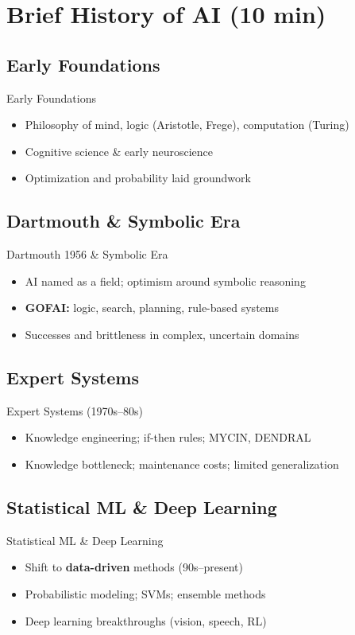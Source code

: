\documentclass[aspectratio=169]{beamer}
\begin{document}
\section{Brief History of AI (10 min)}

\subsection{Early Foundations}
\begin{frame}{Early Foundations}
\begin{itemize}
  \item Philosophy of mind, logic (Aristotle, Frege), computation (Turing)
  \item Cognitive science \& early neuroscience
  \item Optimization and probability laid groundwork
\end{itemize}
\end{frame}

\subsection{Dartmouth \& Symbolic Era}
\begin{frame}{Dartmouth 1956 \& Symbolic Era}
\begin{itemize}
  \item AI named as a field; optimism around symbolic reasoning
  \item \textbf{GOFAI:} logic, search, planning, rule-based systems
  \item Successes and brittleness in complex, uncertain domains
\end{itemize}
\end{frame}

\subsection{Expert Systems}
\begin{frame}{Expert Systems \texorpdfstring{(1970s–80s)}{}}
\begin{itemize}
  \item Knowledge engineering; if-then rules; MYCIN, DENDRAL
  \item Knowledge bottleneck; maintenance costs; limited generalization
\end{itemize}
\end{frame}

\subsection{Statistical ML \& Deep Learning}
\begin{frame}{Statistical ML \& Deep Learning}
\begin{itemize}
  \item Shift to \textbf{data-driven} methods (90s–present)
  \item Probabilistic modeling; SVMs; ensemble methods
  \item Deep learning breakthroughs (vision, speech, RL)
\end{itemize}
\end{frame}
\end{document}
